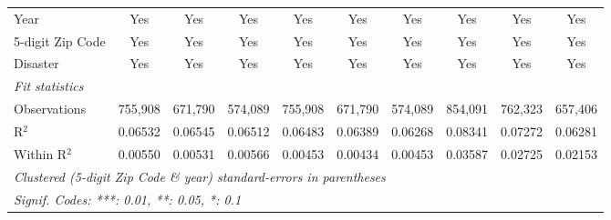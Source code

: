 \begin{tabular}{lccccccccc}
   Year                                                       & Yes           & Yes            & Yes           & Yes           & Yes            & Yes           & Yes          & Yes          & Yes\\  
   5-digit Zip Code                                           & Yes           & Yes            & Yes           & Yes           & Yes            & Yes           & Yes          & Yes          & Yes\\  
   Disaster                                                   & Yes           & Yes            & Yes           & Yes           & Yes            & Yes           & Yes          & Yes          & Yes\\  
   \midrule
   \emph{Fit statistics}\\
   Observations                                               & 755,908       & 671,790        & 574,089       & 755,908       & 671,790        & 574,089       & 854,091      & 762,323      & 657,406\\  
   R$^2$                                                      & 0.06532       & 0.06545        & 0.06512       & 0.06483       & 0.06389        & 0.06268       & 0.08341      & 0.07272      & 0.06281\\  
   Within R$^2$                                               & 0.00550       & 0.00531        & 0.00566       & 0.00453       & 0.00434        & 0.00453       & 0.03587      & 0.02725      & 0.02153\\  
   \midrule \midrule
   \multicolumn{10}{l}{\emph{Clustered (5-digit Zip Code \& year) standard-errors in parentheses}}\\
   \multicolumn{10}{l}{\emph{Signif. Codes: ***: 0.01, **: 0.05, *: 0.1}}\\
\end{tabular}
\par\endgroup
